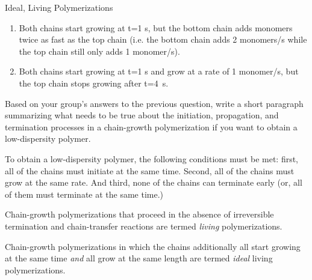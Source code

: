 \begin{activity}{Ideal, Living Polymerizations}
\begin{ctqs}
\begin{enumerate}
			\item Both chains start growing at t=1 s, but the bottom chain adds monomers twice as fast as the top chain (i.e. the bottom chain adds 2 monomers/s while the top chain still only adds 1 monomer/s).
			
				\begin{solution}[0.5in]\studentdisplay{
				}
				\end{solution}

			\item Both chains start growing at t=1 s and grow at a rate of 1 monomer/s, but the top chain stops growing after t=4~s.
			
				\begin{solution}[0.5in]\studentdisplay{
				}
				\end{solution}
				
		\end{enumerate}
		
	\question Based on your group's answers to the previous question, write a short paragraph summarizing what needs to be true about the initiation, propagation, and termination processes in a chain-growth polymerization if you want to obtain a low-dispersity polymer.
	
		\begin{solution}[2in]
			To obtain a low-dispersity polymer, the following conditions must be met: first, all of the chains must initiate at the same time.  Second, all of the chains must grow at the same rate.  And third, none of the chains can terminate early (or, all of them must terminate at the same time.)
		\end{solution}

\end{ctqs}

\begin{infobox}

	Chain-growth polymerizations that proceed in the absence of irreversible termination and chain-transfer reactions are termed \emph{living} polymerizations.
	
	Chain-growth polymerizations in which the chains additionally all start growing at the same time \emph{and} all grow at the same length are termed \emph{ideal} living polymerizations.

\end{infobox}


\end{activity}
